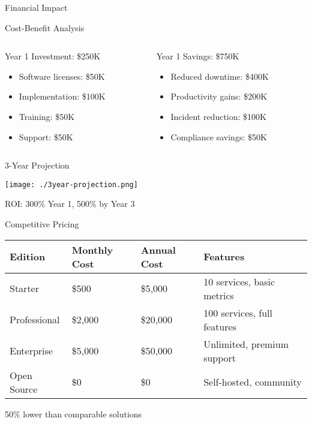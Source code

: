 \documentclass[presentation,aspectratio=169]{beamer}
\begin{document}
\begin{frame}[label={sec:org7846dd2}]{Financial Impact}
\begin{block}{Cost-Benefit Analysis}
\begin{columns}
\begin{column}{0.5\columnwidth}
\alert{Year 1 Investment: \$250K}
\begin{itemize}
\item Software licenses: \$50K
\item Implementation: \$100K
\item Training: \$50K
\item Support: \$50K
\end{itemize}
\end{column}
\begin{column}{0.5\columnwidth}
\alert{Year 1 Savings: \$750K}
\begin{itemize}
\item Reduced downtime: \$400K
\item Productivity gains: \$200K
\item Incident reduction: \$100K
\item Compliance savings: \$50K
\end{itemize}
\end{column}
\end{columns}
\end{block}
\begin{block}{3-Year Projection}
\begin{center}
\begin{center}
\texttt{[image: ./3year-projection.png]}
\end{center}

\alert{ROI: 300\% Year 1, 500\% by Year 3}
\end{center}
\end{block}
\begin{block}{Competitive Pricing}
\begin{center}
\begin{tabular}{llll}
Edition & Monthly Cost & Annual Cost & Features\\
\hline
Starter & \$500 & \$5,000 & 10 services, basic metrics\\
Professional & \$2,000 & \$20,000 & 100 services, full features\\
Enterprise & \$5,000 & \$50,000 & Unlimited, premium support\\
Open Source & \$0 & \$0 & Self-hosted, community\\
\end{tabular}
\end{center}

\alert{50\% lower} than comparable solutions
\end{block}
\end{frame}
\end{document}
